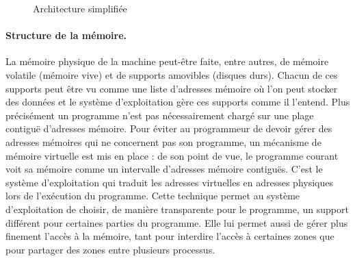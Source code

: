 \begin{figure}[h]
\begin{center}
\end{center}
\caption{Architecture simplifiée}
\label{fig:arch_harvard_mod}
\end{figure}

\paragraph{Structure de la mémoire.}
La mémoire physique de la machine peut-être faite, entre autres, de mémoire volatile (mémoire vive) et de supports amovibles (disques durs).
Chacun de ces supports peut être vu comme une liste d'adresses mémoire où l'on peut stocker des données et le système d'exploitation gère ces supports comme il l'entend.
Plus précisément un programme n'est pas nécessairement chargé sur une plage contiguë d'adresses mémoire.
Pour éviter au programmeur de devoir gérer des adresses mémoires qui ne concernent pas son programme, un mécanisme de mémoire virtuelle est mis en place : de son point de vue, le programme courant voit sa mémoire comme un intervalle d'adresses mémoire contiguës. C'est le système d'exploitation qui traduit les adresses virtuelles en adresses physiques lors de l'exécution du programme.
Cette technique permet au système d'exploitation de choisir, de manière transparente pour le programme, un support différent pour certaines parties du programme. Elle lui permet aussi de gérer plus finement l'accès à la mémoire, tant pour interdire l'accès à certaines zones que pour partager des zones entre plusieurs processus.

